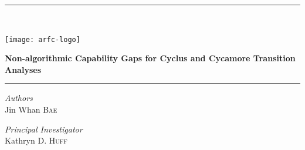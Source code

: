 \begin{titlepage} %
    \newcommand{\HRule}{\rule{\linewidth}{0.5mm}} %
    
    \center %

    
    \HRule\\[0.2cm]
    
     \begin{minipage}{0.4\textwidth}
        \texttt{[image: arfc-logo]}
        \end{minipage}%
        \begin{minipage}{0.6\textwidth}
        {\begin{flushright}\huge\bfseries Non-algorithmic Capability Gaps for Cyclus and Cycamore Transition Analyses\end{flushright}}
        \end{minipage}

    \vspace{0.2cm}
    \HRule
    \vspace{0.5cm}
    
    
    \begin{minipage}{0.4\textwidth}
        \begin{flushleft}
            \large
            \textit{Authors}\\
            Jin Whan \textsc{Bae}\\
        \end{flushleft}
    \end{minipage}
    \begin{minipage}{0.4\textwidth}
        \begin{flushright}
            \large
            \textit{Principal Investigator}\\
            Kathryn D. \textsc{Huff} %
        \end{flushright}
    \end{minipage}
    


\end{titlepage}
